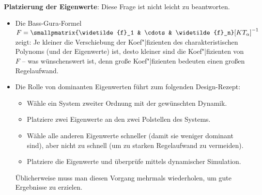 \linie

\textbf{Platzierung der Eigenwerte}:
Diese Frage ist nicht leicht zu beantworten.
\begin{itemize}
    \item
    Die Bass-Gura-Formel
    $F = \smallpmatrix{\widetilde{f}_1 & \cdots & \widetilde{f}_n} [K T_\alpha]^{-1}$
    zeigt:
    Je kleiner die Verschiebung der Koef"|fizienten des charakteristischen Polynoms
    (und der Eigenwerte) ist, desto kleiner sind die Koef"|fizienten von $F$ --
    was wünschenswert ist, denn große Koef"|fizienten bedeuten einen großen Regelaufwand.
    
    \item
    Die Rolle von dominanten Eigenwerten führt zum folgenden Design-Rezept:
    \begin{itemize}
        \item
        Wähle ein System zweiter Ordnung mit der gewünschten Dynamik.
        
        \item
        Platziere zwei Eigenwerte an den zwei Polstellen des Systems.
        
        \item
        Wähle alle anderen Eigenwerte schneller (damit sie weniger dominant sind),
        aber nicht zu schnell (um zu starken Regelaufwand zu vermeiden).
        
        \item
        Platziere die Eigenwerte und überprüfe mittels dynamischer Simulation.
    \end{itemize}
    Üblicherweise muss man diesen Vorgang mehrmals wiederholen,
    um gute Ergebnisse zu erzielen.
\end{itemize}

\pagebreak
